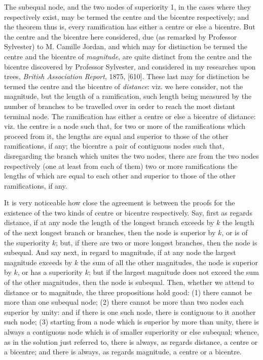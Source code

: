 \documentclass[10pt,twoside]{article}
\begin{document}
The subequal node, and the two nodes of superiority 1, in the cases where they
respectively exist, may be termed the centre and the bicentre respectively; and
the theorem thus is, every ramification has either a centre or else a bicentre.
But the centre and the bicentre here considered, due (as remarked by Professor
Sylvester) to M. Camille Jordan, and which may for distinction be termed the
centre and the bicentre of \textit{magnitude}, are quite distinct from the centre
and the bicentre discovered by Professor Sylvester, and considered in my
researches upon trees, \textit{British Association Report}, 1875, [610]. These
last may for distinction be termed the centre and the bicentre of
\textit{distance}: viz. we here consider, not the magnitude, but the length of a
ramification, such length being measured by the number of branches to be
travelled over in order to reach the most distant terminal node. The
ramification has either a centre or else a bicentre of distance: viz. the centre
is a node such that, for two or more of the ramifications which proceed from it,
the lengths are equal and superior to those of the other ramifications, if any;
the bicentre a pair of contiguous nodes such that, disregarding the branch which
unites the two nodes, there are from the two nodes respectively (one at least
from each of them) two or more ramifications the lengths of which are equal to
each other and superior to those of the other ramifications, if any.

\newpage

It is very noticeable how close the agreement is between the proofs for the
existence of the two kinds of centre or bicentre respectively. Say, first as
regards distance, if at any node the length of the longest branch exceeds by
\(k\) the length of the next longest branch or branches, then the node is
superior by \(k\), or is of the superiority \(k\); but, if there are two or more
longest branches, then the node is subequal. And say next, in regard to
magnitude, if at any node the largest magnitude exceeds by \(k\) the sum of all
the other magnitudes, the node is superior by \(k\), or has a superiority \(k\);
but if the largest magnitude does not exceed the sum of the other magnitudes,
then the node is subequal. Then, whether we attend to distance or to magnitude,
the three propositions hold good: (1) there cannot be more than one subequal
node; (2) there cannot be more than two nodes each superior by unity: and if
there is one such node, there is contiguous to it another such node; (3) starting
from a node which is superior by more than unity, there is always a contiguous
node which is of smaller superiority or else subequal; whence, as in the
solution just referred to, there is always, as regards distance, a centre or a
bicentre; and there is always, as regards magnitude, a centre or a bicentre.
\end{document}
